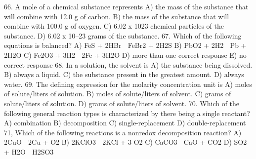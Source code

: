 \documentclass[addpoints, 12pt]{exam}
\begin{document}
\begin{questions}
66.  A mole of a chemical substance represents
A)	the mass of the substance that will combine with 12.0 g of carbon.
B)	the mass of the substance that will combine with 100.0 g of oxygen.
C)	6.02 x 1023 chemical particles of the substance.
D)	6.02 x 10–23 grams of the substance.
67.  Which of the following equations is balanced?
A)	FeS + 2HBr  FeBr2 + 2H2S
B)	PbO2 + 2H2  Pb + 2H2O
C)	Fe2O3 + 3H2  2Fe + 3H2O
D)	more than one correct response
E)	no correct response
68.  In a solution, the solvent is
A)	the substance being dissolved.
B)	always a liquid.
C)	the substance present in the greatest amount.
D)	always water.
69.  The defining expression for the molarity concentration unit is
A)	moles of solute/liters of solution.
B)	moles of solute/liters of solvent.
C)	grams of solute/liters of solution.
D)	grams of solute/liters of solvent.
70.  Which of the following general reaction types is characterized by there being a single reactant?
A)	combination
B)	decomposition
C)	single-replacement
D)	double-replacement
71,  Which of the following reactions is a nonredox decomposition reaction?
A)	2CuO  2Cu + O2
B)	2KClO3  2KCl + 3 O2
C)	CaCO3  CaO + CO2
D)	SO2 + H2O  H2SO3












\end{questions}
\end{document}

